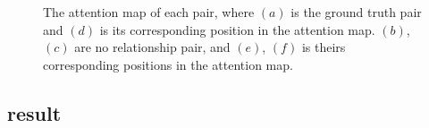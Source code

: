 \begin{figure}[h!]
{\begin{minipage}[t]{5cm}
	\end{minipage}}
	
	\caption[The attention map of each pair.]{The attention map of each pair, where $ (a) $ is the ground truth pair and $ (d) $ is its corresponding position in the attention map. $ (b) $, $(c) $ are no relationship pair, and $ (e) $, $ (f) $ is theirs corresponding positions in the attention map.}
	\label{fig:bus}
\end{figure}







\subsection{result}

